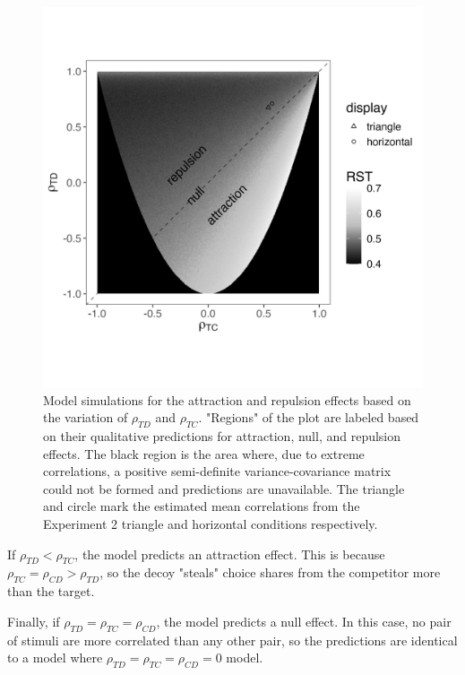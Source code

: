 \begin{figure}
   \includegraphics[width=\linewidth]{figures/3d_sim_rst.jpg}
   \caption{Model simulations for the attraction and repulsion effects based on the variation of $\rho_{TD}$ and $\rho_{TC}$. "Regions" of the plot are labeled based on their qualitative predictions for attraction, null, and repulsion effects. The black region is the area where, due to extreme correlations, a positive semi-definite variance-covariance matrix could not be formed and predictions are unavailable. The triangle and circle mark the estimated mean correlations from the Experiment 2 triangle and horizontal conditions respectively.}
   \label{fig:3d_model}
\end{figure}

If $\rho_{TD}<\rho_{TC}$, the model predicts an attraction effect. This is because $\rho_{TC}=\rho_{CD}>\rho_{TD}$, so the decoy "steals" choice shares from the competitor more than the target.

Finally, if $\rho_{TD}=\rho_{TC}=\rho_{CD}$, the model predicts a null effect. In this case, no pair of stimuli are more correlated than any other pair, so the predictions are identical to a model where $\rho_{TD}=\rho_{TC}=\rho_{CD}=0$ model. 

